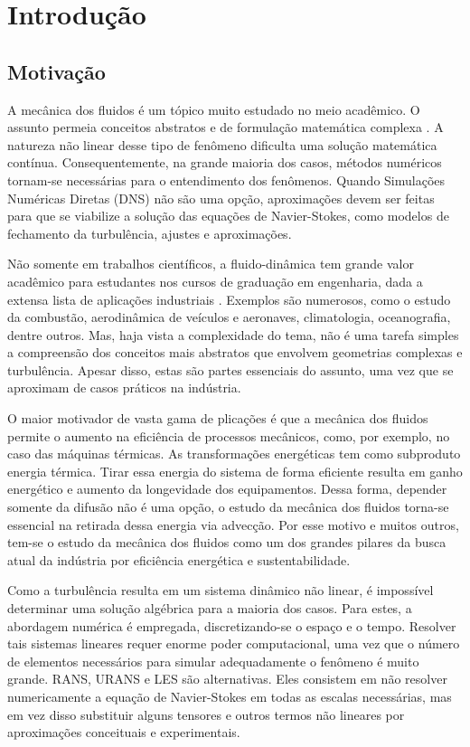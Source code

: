 \chapter[Introdução]{Introdução}
\label{sec:introduction}

\section{Motivação}
A mecânica dos fluidos é um tópico muito estudado no meio acadêmico. O assunto permeia conceitos abstratos e de formulação matemática complexa \cite{hasan}. A natureza não linear desse tipo de fenômeno \cite{John} dificulta uma solução matemática contínua. Consequentemente, na grande maioria dos casos, métodos numéricos tornam-se necessárias para o entendimento dos fenômenos. Quando Simulações Numéricas Diretas (DNS) não são uma opção, aproximações devem ser feitas para que se viabilize a solução das equações de Navier-Stokes, como modelos de fechamento da turbulência, ajustes e aproximações.

Não somente em trabalhos científicos, a fluido-dinâmica tem grande valor acadêmico para estudantes nos cursos de graduação em engenharia, dada a extensa lista de aplicações industriais \cite{CFD_in_learing_2}. Exemplos são numerosos, como o estudo da combustão, aerodinâmica de veículos e aeronaves, climatologia, oceanografia, dentre outros.
Mas, haja vista a complexidade do tema, não é uma tarefa simples a compreensão dos conceitos mais abstratos que envolvem geometrias complexas e turbulência. Apesar disso, estas são partes essenciais do assunto, uma vez que se aproximam de casos práticos na indústria.

O maior motivador de vasta gama de plicações é que a mecânica dos fluidos permite o aumento na eficiência de processos mecânicos, como, por exemplo, no caso das máquinas térmicas. As transformações energéticas tem como subproduto energia térmica. Tirar essa energia do sistema de forma eficiente resulta em ganho energético e aumento da longevidade dos equipamentos. Dessa forma, depender somente da difusão não é uma opção, o estudo da mecânica dos fluidos torna-se essencial na retirada dessa energia via advecção. Por esse motivo e muitos outros, tem-se o estudo da mecânica dos fluidos como um dos grandes pilares da busca atual da indústria por eficiência energética e sustentabilidade.

Como a turbulência resulta em um sistema dinâmico não linear, é impossível determinar uma solução algébrica para a maioria dos casos. Para estes, a abordagem numérica é empregada, discretizando-se o espaço e o tempo. Resolver tais sistemas lineares requer enorme poder computacional, uma vez que o número de elementos necessários para simular adequadamente o fenômeno é muito grande. RANS, URANS e LES são alternativas. Eles consistem em não resolver numericamente a equação de Navier-Stokes em todas as escalas necessárias, mas em vez disso substituir alguns tensores e outros termos não lineares por aproximações conceituais e experimentais.

